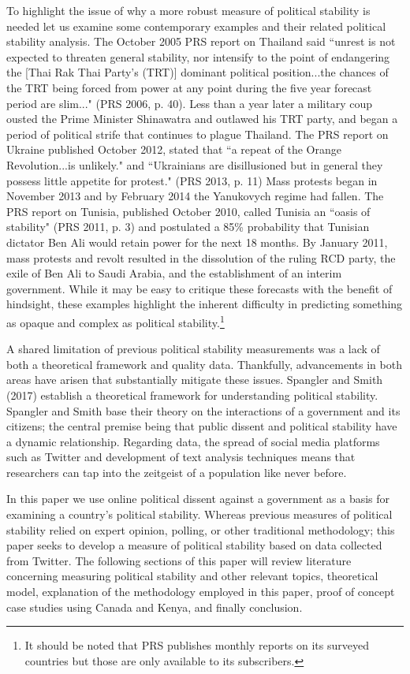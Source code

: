 \documentclass[12pt]{article}
\begin{document}
\begin{spacing}{1.5}
To highlight the issue of why a more robust measure of political stability is needed let us examine some contemporary examples and their related political stability analysis. The October 2005 PRS report on Thailand said ``unrest is not expected to threaten general stability, nor intensify to the point of endangering the [Thai Rak Thai Party's (TRT)] dominant political position...the chances of the TRT being forced from power at any point during the five year forecast period are slim..." (PRS 2006, p. 40). Less than a year later a military coup ousted the Prime Minister Shinawatra and outlawed his TRT party, and began a period of political strife that continues to plague Thailand. The PRS report on Ukraine published October 2012, stated that ``a repeat of the Orange Revolution...is unlikely." and ``Ukrainians are disillusioned but in general they possess little appetite for protest." (PRS 2013, p. 11) Mass protests began in November 2013 and by February 2014 the Yanukovych regime had fallen. The PRS report on Tunisia, published October 2010, called Tunisia an ``oasis of stability" (PRS 2011, p. 3) and postulated a 85\% probability that Tunisian dictator Ben Ali would retain power for the next 18 months. By January 2011, mass protests and revolt resulted in the dissolution of the ruling RCD party, the exile of Ben Ali to Saudi Arabia, and the establishment of an interim government. While it may be easy to critique these forecasts with the benefit of hindsight, these examples highlight the inherent difficulty in predicting something as opaque and complex as political stability.\footnote{It should be noted that PRS publishes monthly reports on its surveyed countries but those are only available to its subscribers.} 

A shared limitation of previous political stability measurements was a lack of both a theoretical framework and quality data. Thankfully, advancements in both areas have arisen that substantially mitigate these issues. Spangler and Smith (2017) establish a theoretical framework for understanding political stability. Spangler and Smith base their theory on the interactions of a government and its citizens; the central premise being that public dissent and political stability have a dynamic relationship. Regarding data, the spread of social media platforms such as Twitter and development of text analysis techniques means that researchers can tap into the zeitgeist of a population like never before. 

In this paper we use online political dissent against a government as a basis for examining a country's political stability. Whereas previous measures of political stability relied on expert opinion, polling, or other traditional methodology; this paper seeks to develop a measure of political stability based on data collected from Twitter. The following sections of this paper will review literature concerning measuring political stability and other relevant topics, theoretical model, explanation of the methodology employed in this paper, proof of concept case studies using Canada and Kenya, and finally conclusion. 


\end{spacing}
\end{document}
